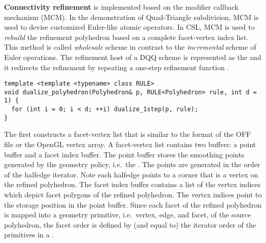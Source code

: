 \noindent \textbf{Connectivity refinement} is implemented
based on the modifier callback mechanism (MCM). In the 
demonstration of Quad-Triangle subdivision, MCM is used to devise 
customized Euler-like atomic operators. In CSL, MCM is used to 
\emph{rebuild} the refinement polyhedron based on 
a complete facet-vertex index list. This method is called \emph{wholesale} 
scheme in contrast to the \emph{incremental} scheme of Euler operations.
The refinement host of a DQQ scheme is represented as the
 and it
redirects the refinement by repeating a one-step
refinement function .
\begin{lstlisting}
template <template <typename> class RULE>
void dualize_polyhedron(Polyhedron& p, RULE<Polyhedron> rule, int d = 1) {
  for (int i = 0; i < d; ++i) dualize_1step(p, rule);
}
\end{lstlisting}
The  first constructs a facet-vertex list
that is similar to the format of the OFF file or the 
OpenGL vertex array. A facet-vertex list contains two buffers:
a point buffer and a facet index buffer. The point buffer stores the
smoothing points generated by the geometry policy, i.e.\ the .
The points are generated in the order of the halfedge 
iterator. Note each halfedge points to a corner that is 
a vertex on the refined polyhedron.
The facet index buffer contains a list of 
the vertex indices which depict facet polygons of the 
refined polyhedron. The vertex indices point to the storage position
in the point buffer. Since each facet of the 
refined polyhedron is mapped into a geometry primitive, 
i.e.\ vertex, edge, and facet, of the source polyhedron, the facet
order is defined by (and equal to) the iterator order of the 
primitives in a \cgalpoly .   
